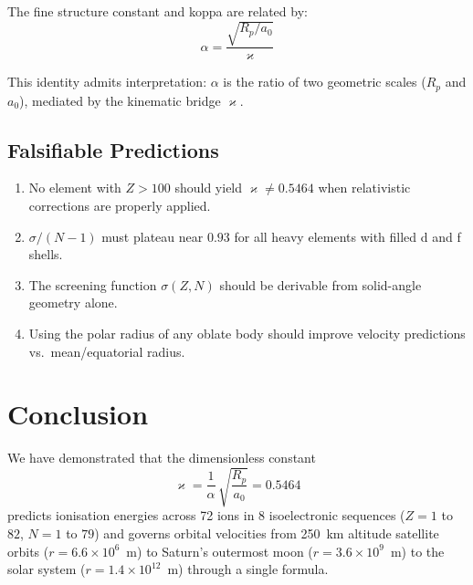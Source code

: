 \documentclass[twocolumn,epjc3]{svjour3}
\newcommand{\kop}{\varkappa}  %
\begin{document}
The fine structure constant and koppa are related by:
\begin{equation}
  \alpha = \frac{\sqrt{R_p/a_0}}{\kop}
\end{equation}

This identity admits interpretation: $\alpha$ is the ratio of two geometric scales ($R_p$ and $a_0$), mediated by the kinematic bridge $\kop$.

\subsection{Falsifiable Predictions}

\begin{enumerate}
  \item No element with $Z > 100$ should yield $\kop \neq 0.5464$ when relativistic corrections are properly applied.
  \item $\sigma/(N{-}1)$ must plateau near $0.93$ for all heavy elements with filled d and f shells.
  \item The screening function $\sigma(Z,N)$ should be derivable from solid-angle geometry alone.
  \item Using the polar radius of any oblate body should improve velocity predictions vs.\ mean/equatorial radius.
\end{enumerate}


\section{Conclusion}
\label{sec:conclusion}

We have demonstrated that the dimensionless constant
\begin{equation}
  \kop = \frac{1}{\alpha}\,\sqrt{\frac{R_p}{a_0}} = 0.5464
\end{equation}
predicts ionisation energies across 72 ions in 8 isoelectronic sequences ($Z = 1$ to $82$, $N = 1$ to $79$) and governs orbital velocities from 250~km altitude satellite orbits ($r = 6.6 \times 10^6$~m) to Saturn's outermost moon ($r = 3.6 \times 10^9$~m) to the solar system ($r = 1.4 \times 10^{12}$~m) through a single formula.
\end{document}
